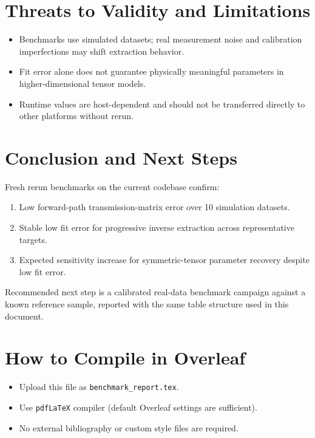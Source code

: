 \documentclass[11pt]{article}
\begin{document}
\section{Threats to Validity and Limitations}

\begin{itemize}
    \item Benchmarks use simulated datasets; real measurement noise and calibration imperfections may shift extraction behavior.
    \item Fit error alone does not guarantee physically meaningful parameters in higher-dimensional tensor models.
    \item Runtime values are host-dependent and should not be transferred directly to other platforms without rerun.
\end{itemize}

\section{Conclusion and Next Steps}

Fresh rerun benchmarks on the current codebase confirm:
\begin{enumerate}
    \item Low forward-path transmission-matrix error over 10 simulation datasets.
    \item Stable low fit error for progressive inverse extraction across representative targets.
    \item Expected sensitivity increase for symmetric-tensor parameter recovery despite low fit error.
\end{enumerate}

Recommended next step is a calibrated real-data benchmark campaign against a known reference sample, reported with the same table structure used in this document.

\section*{How to Compile in Overleaf}

\begin{itemize}
    \item Upload this file as \texttt{benchmark\_report.tex}.
    \item Use \texttt{pdfLaTeX} compiler (default Overleaf settings are sufficient).
    \item No external bibliography or custom style files are required.
\end{itemize}
\end{document}
